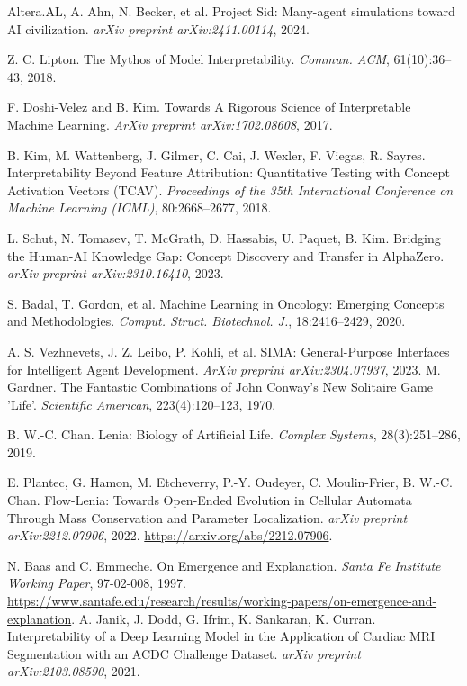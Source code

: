 \documentclass[11pt]{article}
\begin{document}
\begin{thebibliography}{9}
Altera.AL, A. Ahn, N. Becker, et al.
\newblock Project Sid: Many-agent simulations toward AI civilization.
\newblock \emph{arXiv preprint arXiv:2411.00114}, 2024.

Z. C. Lipton.
\newblock The Mythos of Model Interpretability.
\newblock \emph{Commun. ACM}, 61(10):36--43, 2018.

F. Doshi-Velez and B. Kim.
\newblock Towards A Rigorous Science of Interpretable Machine Learning.
\newblock \emph{ArXiv preprint arXiv:1702.08608}, 2017.

B. Kim, M. Wattenberg, J. Gilmer, C. Cai, J. Wexler, F. Viegas, R. Sayres.
\newblock Interpretability Beyond Feature Attribution: Quantitative Testing with Concept Activation Vectors (TCAV).
\newblock \emph{Proceedings of the 35th International Conference on Machine Learning (ICML)}, 80:2668--2677, 2018.

L. Schut, N. Tomasev, T. McGrath, D. Hassabis, U. Paquet, B. Kim.
\newblock Bridging the Human-AI Knowledge Gap: Concept Discovery and Transfer in AlphaZero.
\newblock \emph{arXiv preprint arXiv:2310.16410}, 2023.

S. Badal, T. Gordon, et al.
\newblock Machine Learning in Oncology: Emerging Concepts and Methodologies.
\newblock \emph{Comput. Struct. Biotechnol. J.}, 18:2416--2429, 2020.

A. S. Vezhnevets, J. Z. Leibo, P. Kohli, et al.
\newblock SIMA: General-Purpose Interfaces for Intelligent Agent Development.
\newblock \emph{ArXiv preprint arXiv:2304.07937}, 2023.
M. Gardner. 
\newblock The Fantastic Combinations of John Conway's New Solitaire Game 'Life'.
\newblock \emph{Scientific American}, 223(4):120--123, 1970.

B. W.-C. Chan.
\newblock Lenia: Biology of Artificial Life.
\newblock \emph{Complex Systems}, 28(3):251--286, 2019.

E. Plantec, G. Hamon, M. Etcheverry, P.-Y. Oudeyer, C. Moulin-Frier, B. W.-C. Chan.
\newblock Flow-Lenia: Towards Open-Ended Evolution in Cellular Automata Through Mass Conservation and Parameter Localization.
\newblock \emph{arXiv preprint arXiv:2212.07906}, 2022. \newblock \url{https://arxiv.org/abs/2212.07906}.

N. Baas and C. Emmeche.
\newblock On Emergence and Explanation.
\newblock \emph{Santa Fe Institute Working Paper}, 97-02-008, 1997.
\newblock \url{https://www.santafe.edu/research/results/working-papers/on-emergence-and-explanation}.
A. Janik, J. Dodd, G. Ifrim, K. Sankaran, K. Curran.
\newblock Interpretability of a Deep Learning Model in the Application of Cardiac MRI Segmentation with an ACDC Challenge Dataset.
\newblock \emph{arXiv preprint arXiv:2103.08590}, 2021.

\end{thebibliography}
\end{document}

